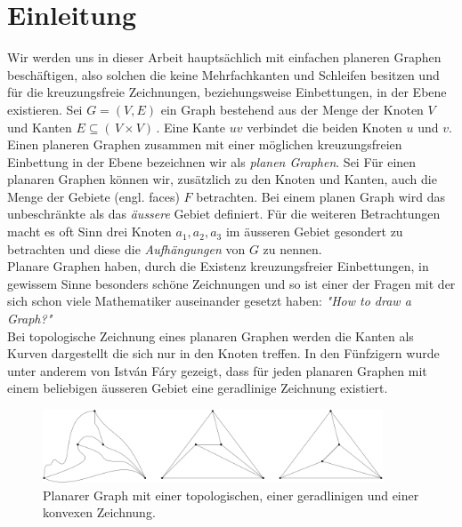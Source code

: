 \chapter{Einleitung}\label{intro}

Wir werden uns in dieser Arbeit hauptsächlich mit einfachen planeren Graphen beschäftigen, also solchen die keine Mehrfachkanten und Schleifen besitzen und für die kreuzungsfreie Zeichnungen, beziehungsweise Einbettungen, in der Ebene existieren. Sei $G = (V,E)$ ein Graph bestehend aus der Menge der Knoten $V$ und Kanten $E \subseteq ( \,V \times V ) \,$. Eine Kante $uv$ verbindet die beiden Knoten $u$ und $v$. Einen planeren Graphen zusammen mit einer möglichen kreuzungsfreien Einbettung in der Ebene bezeichnen wir als \textit{planen Graphen}. Sei Für einen planaren Graphen können wir, zusätzlich zu den Knoten und Kanten, auch die Menge der Gebiete (engl. faces) $F$ betrachten. Bei einem planen Graph wird das unbeschränkte als das \textit{äussere} Gebiet definiert. Für die weiteren Betrachtungen macht es oft Sinn drei Knoten $a_1,a_2,a_3$ im äusseren Gebiet gesondert zu betrachten und diese die \textit{Aufhängungen} von $G$ zu nennen.\\

Planare Graphen haben, durch die Existenz kreuzungsfreier Einbettungen, in gewissem Sinne besonders schöne Zeichnungen und so ist einer der Fragen mit der sich schon viele Mathematiker auseinander gesetzt haben: \textit{"How to draw a Graph?"}\cite{tutte63}\\

Bei topologische Zeichnung eines planaren Graphen werden die Kanten als Kurven dargestellt die sich nur in den Knoten treffen. In den Fünfzigern wurde unter anderem von István Fáry gezeigt, dass für jeden planaren Graphen mit einem beliebigen äusseren Gebiet eine geradlinige Zeichnung existiert. \cite{fary48}

\begin{figure}
	\centering
  \includegraphics[width=0.9\textwidth]{topo_straight_convex.png}
	\caption{Planarer Graph mit einer topologischen, einer geradlinigen und einer konvexen Zeichnung.}
	\label{cut_figure}
\end{figure}

